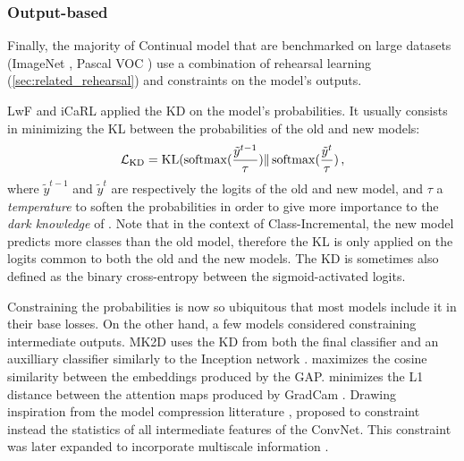 \subsubsection{Output-based}
\label{sec:related_regul_output}

Finally, the majority of Continual model that are benchmarked on large datasets (\eg ImageNet
\citep{deng2009imagenet}, Pascal VOC \citep{everingham2015pascalvoc}) use a combination of rehearsal
learning (\autoref{sec:related_rehearsal}) and constraints on the model's outputs.

LwF \cite{li2018lwf} and iCaRL applied the \ac{KD} \cite{hinton2015knowledge_distillation} on the
model's probabilities. It usually consists in minimizing the \ac{KL} between the probabilities
of the old and new models:
%
\begin{equation}
      \mathcal{L}_\text{KD} = \operatorname{KL}(\operatorname{softmax}(\frac{\tilde{y}^{t-1}}{\tau}) \Vert \operatorname{softmax}(\frac{\tilde{y}^t}{\tau})\,,
\end{equation}
%
where $\tilde{y}^{t-1}$ and $\tilde{y}^{t}$ are respectively the logits of the old and new model,
and $\tau$ a \textit{temperature} to soften the probabilities in order to give more importance to
the \textit{dark knowledge} of \cite{hinton2015knowledge_distillation}. Note that in the context of
Class-Incremental, the new model predicts more classes than the old model, therefore the \ac{KL} is
only applied on the logits common to both the old and the new models. The \ac{KD} is sometimes also
defined as the binary cross-entropy between the sigmoid-activated logits.

Constraining the probabilities is now so ubiquitous that most models include it in their base
losses. On the other hand, a few models considered constraining intermediate outputs. MK2D
\citep{peng2019m2kd} uses the \ac{KD} from both the final classifier and an auxilliary classifier
similarly to the Inception network \citep{szegedy2015inception}. \cite{hou2019ucir} maximizes the
cosine similarity between the embeddings produced by the \ac{GAP}.
\cite{dhar2019learning_without_memorizing_gradcam} minimizes the L1 distance between the attention
maps produced by GradCam \citep{selvaraju2017gradcam}. Drawing inspiration from the model
compression litterature \cite{zagoruyko2016distillation_attention}, \cite{douillard2020podnet}
proposed to constraint instead the statistics of all intermediate features of the \ac{ConvNet}. This
constraint was later expanded to incorporate multiscale information \cite{douillard2020plop}.

